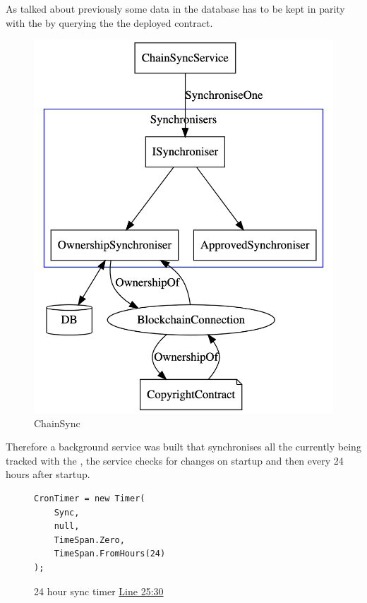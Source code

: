 \br

\label{sec:chainSync}
As talked about previously some data in the database has to be kept in parity with the  by querying the the deployed contract.

\begin{figure}[H]
\caption{ChainSync}
\centering
\includegraphics[width=\textwidth,height=0.5\textheight,keepaspectratio]{images/operational/chain-sync}
\end{figure}

Therefore a background service was built that synchronises all the  currently being tracked with the , the service checks for changes on startup and then every 24 hours after startup.

\begin{figure}[H]
\caption{24 hour sync timer \href{https://github.com/MrHarrisonBarker/CRPL/blob/main/CRPL.Web/Core/ChainSync/ChainSyncService.cs}{Line 25:30}}
\centering
\begin{lstlisting}[language=CSharp]
CronTimer = new Timer(
	Sync,
	null,
	TimeSpan.Zero,
	TimeSpan.FromHours(24)
);
\end{lstlisting}
\end{figure}

